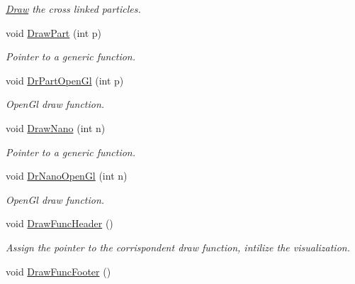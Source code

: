 \begin{DoxyCompactItemize}
\begin{DoxyCompactList}\small\item\em \hyperlink{classDraw}{Draw} the cross linked particles. \end{DoxyCompactList}\item 
void \hyperlink{classElPoly_aefa30992af110f1b0e1b60ee028b9f38}{Draw\+Part} (int p)\hypertarget{classElPoly_aefa30992af110f1b0e1b60ee028b9f38}{}\label{classElPoly_aefa30992af110f1b0e1b60ee028b9f38}

\begin{DoxyCompactList}\small\item\em Pointer to a generic function. \end{DoxyCompactList}\item 
void \hyperlink{classElPoly_a65249b90a9125f72098eee0fde2a2155}{Dr\+Part\+Open\+Gl} (int p)\hypertarget{classElPoly_a65249b90a9125f72098eee0fde2a2155}{}\label{classElPoly_a65249b90a9125f72098eee0fde2a2155}

\begin{DoxyCompactList}\small\item\em Open\+Gl draw function. \end{DoxyCompactList}\item 
void \hyperlink{classElPoly_a15254dc837a01412ec79ec26e9019095}{Draw\+Nano} (int n)\hypertarget{classElPoly_a15254dc837a01412ec79ec26e9019095}{}\label{classElPoly_a15254dc837a01412ec79ec26e9019095}

\begin{DoxyCompactList}\small\item\em Pointer to a generic function. \end{DoxyCompactList}\item 
void \hyperlink{classElPoly_a7bfac52311cca966565486c45b0b2097}{Dr\+Nano\+Open\+Gl} (int n)\hypertarget{classElPoly_a7bfac52311cca966565486c45b0b2097}{}\label{classElPoly_a7bfac52311cca966565486c45b0b2097}

\begin{DoxyCompactList}\small\item\em Open\+Gl draw function. \end{DoxyCompactList}\item 
void \hyperlink{classElPoly_a878c5cd187a779112e98485c1fd4fa7a}{Draw\+Func\+Header} ()\hypertarget{classElPoly_a878c5cd187a779112e98485c1fd4fa7a}{}\label{classElPoly_a878c5cd187a779112e98485c1fd4fa7a}

\begin{DoxyCompactList}\small\item\em Assign the pointer to the corrispondent draw function, intilize the visualization. \end{DoxyCompactList}\item 
void \hyperlink{classElPoly_ae201022731c9c081b2c8575bb4d80929}{Draw\+Func\+Footer} ()\hypertarget{classElPoly_ae201022731c9c081b2c8575bb4d80929}{}\label{classElPoly_ae201022731c9c081b2c8575bb4d80929}


\end{DoxyCompactItemize}
